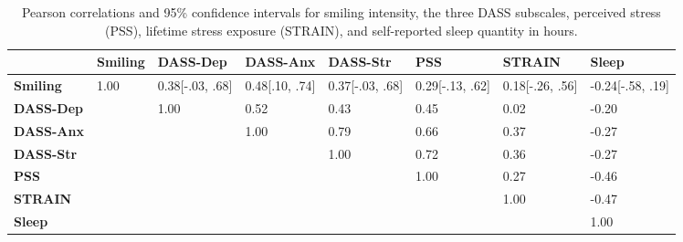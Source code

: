 \documentclass[authordate, empirical]{jote-new-article}
\begin{document}
\begin{table}
  \begin{fullwidth}
    \caption{Pearson correlations and 95\% confidence intervals for smiling intensity, the three DASS subscales, perceived stress (PSS), lifetime stress exposure (STRAIN), and self-reported sleep quantity in hours.}
    \begin{tabularx}{\linewidth}{@{} l l l l l l l l @{}}
      \toprule
                        & \textbf{Smiling} & \textbf{DASS-Dep} & \textbf{DASS-Anx} & \textbf{DASS-Str} & \textbf{PSS}    & \textbf{STRAIN} & \textbf{Sleep} \\
      \midrule

      \textbf{Smiling}  & 1.00             & 0.38[-.03, .68]   & 0.48[.10, .74]    & 0.37[-.03, .68]   & 0.29[-.13, .62]
                        & 0.18[-.26, .56]  & -0.24[-.58, .19]                                                                                               \\

      \textbf{DASS-Dep} &                  & 1.00              & 0.52              & 0.43              & 0.45            & 0.02            & -0.20          \\

      \textbf{DASS-Anx} &                  &                   & 1.00              & 0.79              & 0.66            & 0.37            & -0.27          \\

      \textbf{DASS-Str} &                  &                   &                   & 1.00              & 0.72            & 0.36            & -0.27          \\

      \textbf{PSS}      &                  &                   &                   &                   & 1.00            & 0.27            & -0.46          \\

      \textbf{STRAIN}   &                  &                   &                   &                   &                 & 1.00            & -0.47          \\

      \textbf{Sleep}    &                  &                   &                   &                   &                 &                 & 1.00           \\
    \end{tabularx}
  \end{fullwidth}
\end{table}
\end{document}
